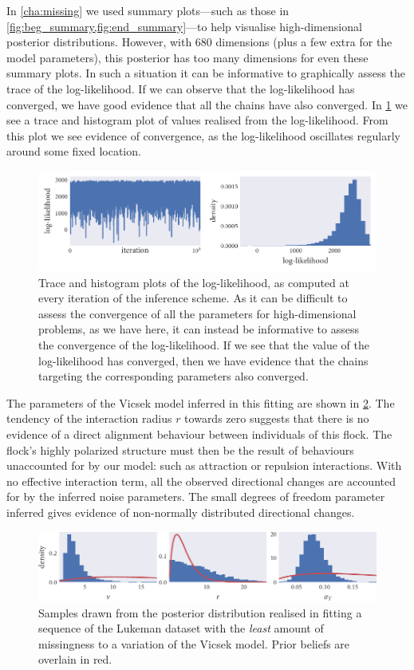 In \cref{cha:missing} we used summary plots---such as those in
\cref{fig:beg_summary,fig:end_summary}---to help visualise high-dimensional
posterior distributions. However, with $680$ dimensions (plus a few extra for
the model parameters), this posterior has too many dimensions for even these
summary plots. In such a situation it can be informative to graphically assess
the trace of the log-likelihood. If we can observe that the log-likelihood has
converged, we have good evidence that all the chains have also converged. In
\cref{fig:log_ll} we see a trace and histogram plot of values realised from the
log-likelihood. From this plot we see evidence of convergence, as the
log-likelihood oscillates regularly around some fixed location.

\begin{figure}[tb]
  \includegraphics{log_likelihood.pdf}
  \caption{Trace and histogram plots of the log-likelihood, as computed at
    every iteration of the inference scheme. As it can be difficult to assess
    the convergence of all the parameters for high-dimensional problems, as
    we have here, it can instead be informative to assess the convergence of
    the log-likelihood. If we see that the value of the log-likelihood has
    converged, then we have evidence that the chains targeting the corresponding
    parameters also converged.}
    \label{fig:log_ll}
\end{figure}

The parameters of the Vicsek model inferred in this fitting are shown in
\cref{fig:lukeman_params}. The tendency of the interaction radius $r$ towards
zero suggests that there is no evidence of a direct alignment behaviour between
individuals of this flock. The flock's highly polarized structure must then be
the result of behaviours unaccounted for by our model: such as attraction or
repulsion interactions. With no effective interaction term, all the observed
directional changes are accounted for by the inferred noise parameters. The
small degrees of freedom parameter inferred gives evidence of non-normally
distributed directional changes.

\begin{figure}[tb]
  \includegraphics{params_hist.pdf}
  \caption{Samples drawn from the posterior distribution realised in fitting a
    sequence of the Lukeman dataset with the \emph{least} amount of missingness
    to a variation of the Vicsek model. Prior beliefs are overlain in red.}
  \label{fig:lukeman_params}
\end{figure}

